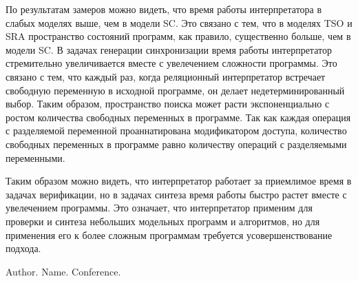 
По результатам замеров можно видеть, что время работы интерпретатора 
в слабых моделях выше, чем в модели SC. 
Это связано с тем, что в моделях TSO и SRA пространство состояний программ, 
как правило, существенно больше, чем в модели SC.
В задачах генерации синхронизации время работы интерпретатор
стремительно увеличивается вместе с увелечением сложности программы.
Это связано с тем, что каждый раз, когда реляционный интерпретатор встречает
свободную переменную в исходной программе, он делает
недетерминированный выбор. 
Таким образом, пространство поиска может
расти экспоненциально с ростом количества свободных переменных в программе.
Так как каждая операция с разделяемой переменной проаннатирована 
модификатором доступа, количество свободных переменных в программе
равно количеству операций с разделяемыми переменными. 

Таким образом можно видеть, что интерпретатор 
работает за приемлимое время в задачах верификации, 
но в задачах синтеза время работы быстро растет вместе с увелечением программы.
Это означает, что интерпретатор применим для проверки и синтеза 
небольших модельных программ и алгоритмов,
но для применения его к более сложным программам требуется
усовершенствование подхода.


\begin{thebibliography}{99}

  Author. Name. Conference.
  
\end{thebibliography}
  
